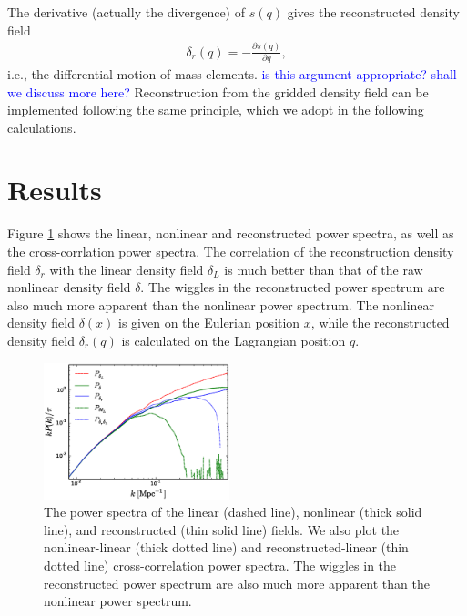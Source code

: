 \documentclass[aps,prd,twocolumn,showpacs,superscriptaddress,groupedaddress,nofootinbib]{revtex4}  %
\newcommand{\tcb}{\textcolor{blue}}
\newcommand{\bea}{\begin{eqnarray}}
\newcommand{\eea}{\end{eqnarray}}
\begin{document}
The derivative (actually the divergence) of $s(q)$ gives the reconstructed 
density field 
\bea
\delta_r({q})=-\frac{\partial s(q)}{\partial q},
\eea
i.e., the differential motion of mass elements. 
\tcb{is this argument appropriate? shall we discuss more here?}
Reconstruction from the gridded density field can be implemented following
the same principle, which we adopt in the following calculations.


\section{Results}
\label{res}
Figure \ref{fig:ps} shows the linear, nonlinear and reconstructed power spectra,
as well as the cross-corrlation power spectra.
The correlation of the reconstruction density field $\delta_r$ with the linear
density field $\delta_L$ is much better than that of the raw nonlinear density 
field $\delta$. The wiggles in the reconstructed power spectrum are also much 
more apparent than the nonlinear power spectrum.
The nonlinear density field $\delta(x)$ is given on the Eulerian position $x$,
while the reconstructed density field $\delta_r(q)$ is calculated on the 
Lagrangian position $q$. 

\begin{figure}[tbp]
\begin{center}
\includegraphics[width=0.48\textwidth]{f3x.eps}
\end{center}
\vspace{-0.7cm}
\caption{The power spectra of the linear (dashed line), nonlinear (thick solid
line), and reconstructed (thin solid line) fields. 
We also plot the nonlinear-linear (thick dotted line) and 
reconstructed-linear (thin dotted line) cross-correlation power spectra.
The wiggles in the reconstructed power spectrum are also much 
more apparent than the nonlinear power spectrum.}
\label{fig:ps}
\end{figure}
\end{document}
